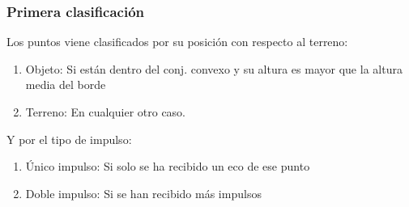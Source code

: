 \begin{frame}
  \frametitle{Primera clasificación}
Los puntos viene clasificados por su posición con respecto al terreno: \pause
\begin{enumerate}
 \item \alert{Objeto}: Si están dentro del conj. convexo y su altura es mayor que la altura media del borde
 \item \alert{Terreno}: En cualquier otro caso.
\end{enumerate}

\pause
Y por el tipo de impulso:
\begin{enumerate}
 \item \alert{Único impulso}: Si solo se ha recibido un eco de ese punto
 \item \alert{Doble impulso}: Si se han recibido más impulsos
\end{enumerate}
\end{frame}
